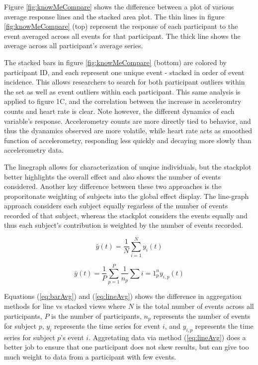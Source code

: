 Figure \ref{fig:knowMeCompare} shows the difference between a plot of various average response lines and the stacked area plot.
The thin lines in figure \ref{fig:knowMeCompare} (top) represent the response of each participant to the event averaged across all events for that participant.
The thick line shows the average across all participant’s average series.

The stacked bars in figure \ref{fig:knowMeCompare} (bottom) are colored by participant ID, and each represent one unique event - stacked in order of event incidence.
This allows researchers to search for both participant outliers within the set as well as event outliers within each participant.
This same analysis is applied to figure 1C, and the correlation between the increase in acceleromtry counts and heart rate is clear.
Note however, the different dynamics of each variable's response.
Accelerometry counts are more directly tied to behavior, and thus the dyanamics observed are more volatile, while heart rate acts as smoothed function of accelerometry, responding less quickly and decaying more slowly than accelerometry data.

The linegraph allows for characterization of unqiue individuals, but the stackplot better highlights the overall effect and also shows the number of events considered.
Another key difference between these two approaches is the proporitonate weighting of subjects into the global effect display.
The line-graph approach considers each subject equally regarless of the number of events recorded of that subject, whereas the stackplot considers the events equally and thus each subject's contribution is weighted by the number of events recorded.

\begin{equation}
	\bar{y}(t) = \frac{1}{N} \sum\limits_{i=1}^N y_i(t)
	\label{eq:barAvg}
\end{equation}

\begin{equation}
	\bar{y}(t) = \frac{1}{P} \sum\limits_{p=1}^P \frac{1}{n_p} \sum\limits{i=1}^n_p y_{i,p}(t)
	\label{eq:lineAvg}
\end{equation}
	
Equations (\ref{eq:barAvg}) and (\ref{eq:lineAvg}) shows the difference in aggregation methods for line vs stacked views where $N$ is the total number of events across all participants, $P$ is the number of participants, $n_p$ represents the number of events for subject $p$,  $y_i$ represents the time series for event $i$, and $y_{i,p}$ represents the time series for subject $p$'s event $i$.
Aggretating data via method (\ref{eq:lineAvg}) does a better job to ensure that one participant does not skew results, but can give too much weight to data from a participant with few events.

